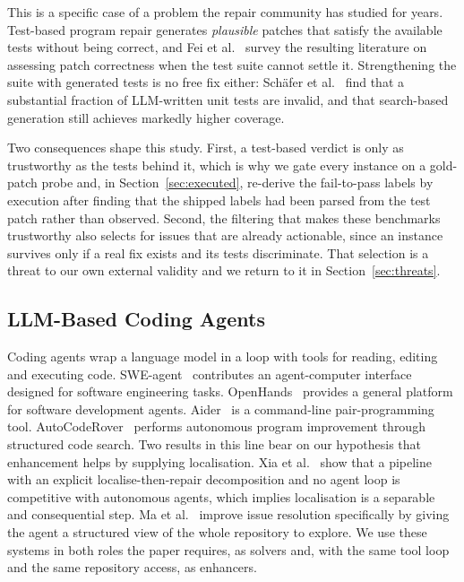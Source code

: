 \documentclass[journal]{IEEEtran}
\begin{document}
This is a specific case of a problem the repair community has studied for years. Test-based
program repair generates \emph{plausible} patches that satisfy the available tests without
being correct, and Fei et al.~\cite{fei2025patchcorrectness} survey the resulting literature
on assessing patch correctness when the test suite cannot settle it. Strengthening the suite
with generated tests is no free fix either: Sch\"afer et al.~\cite{schaefer2024testgen} find
that a substantial fraction of LLM-written unit tests are invalid, and that search-based generation still
achieves markedly higher coverage.

Two consequences shape this study. First, a test-based verdict is only as trustworthy as the
tests behind it, which is why we gate every instance on a gold-patch probe and, in
Section~\ref{sec:executed}, re-derive the fail-to-pass labels by execution after finding that
the shipped labels had been parsed from the test patch rather than observed. Second, the
filtering that makes these benchmarks trustworthy also selects for issues that are already
actionable, since an instance survives only if a real fix exists and its tests discriminate.
That selection is a threat to our own external validity and we return to it in
Section~\ref{sec:threats}.

\subsection{LLM-Based Coding Agents}

Coding agents wrap a language model in a loop with tools for reading, editing and executing
code. SWE-agent~\cite{yang2024swe} contributes an agent-computer interface designed for
software engineering tasks. OpenHands~\cite{wang2024openhands} provides a general platform for
software development agents. Aider~\cite{aider2024} is a command-line pair-programming tool.
AutoCodeRover~\cite{zhang2024autocoderover} performs autonomous program improvement through
structured code search. Two results in this line bear on our hypothesis that enhancement helps
by supplying localisation. Xia et al.~\cite{xia2024agentless} show that a pipeline with an
explicit localise-then-repair decomposition and no agent loop is competitive with autonomous
agents, which implies localisation is a separable and consequential step. Ma et
al.~\cite{ma2025lingmaagent} improve issue resolution specifically by giving the agent a
structured view of the whole repository to explore. We use these systems in both roles the paper requires, as solvers and,
with the same tool loop and the same repository access, as enhancers.
\end{document}
